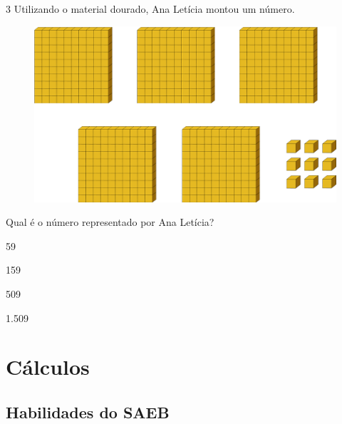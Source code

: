 \num{3} Utilizando o material dourado, Ana Letícia montou um número.

\begin{figure}[htpb!]
\centering
\includegraphics[width=\textwidth]{./media/image9.png}
\end{figure}

Qual é o número representado por Ana Letícia? 

\begin{escolha}
  \begin{multicols}{2}
\item
  59
\item
  159
\item
  509
\item
  1.509
  \end{multicols}
\end{escolha}

\chapter{Cálculos}

\section*{Habilidades do SAEB}

